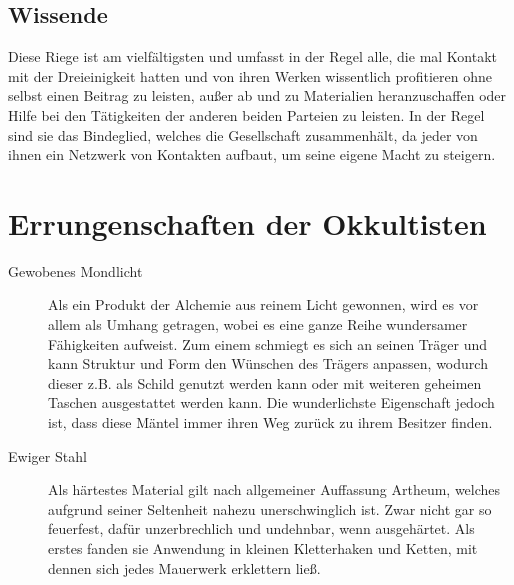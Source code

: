 \documentclass[a4paper,12pt,oneside]{book}
\begin{document}
\subsection{Wissende}
Diese Riege ist am vielfältigsten und umfasst in der Regel alle, die mal Kontakt mit der Dreieinigkeit hatten und von ihren Werken wissentlich profitieren ohne selbst einen Beitrag zu leisten, außer ab und zu Materialien heranzuschaffen oder Hilfe bei den Tätigkeiten der anderen beiden Parteien zu leisten. In der Regel sind sie das Bindeglied, welches die Gesellschaft zusammenhält, da jeder von ihnen ein Netzwerk von Kontakten aufbaut, um seine eigene Macht zu steigern.
\section{Errungenschaften der Okkultisten}
\begin{description}
\item[Gewobenes Mondlicht]Als ein Produkt der Alchemie aus reinem Licht gewonnen, wird es vor allem als Umhang getragen, wobei es eine ganze Reihe wundersamer Fähigkeiten aufweist. Zum einem schmiegt es sich an seinen Träger und kann Struktur und Form den Wünschen des Trägers anpassen, wodurch dieser z.B. als Schild genutzt werden kann oder mit weiteren geheimen Taschen ausgestattet werden kann. Die wunderlichste Eigenschaft jedoch ist, dass diese Mäntel immer ihren Weg zurück zu ihrem Besitzer finden.
\item[Ewiger Stahl]Als härtestes Material gilt nach allgemeiner Auffassung Artheum, welches aufgrund seiner Seltenheit nahezu unerschwinglich ist. Zwar nicht gar so feuerfest, dafür unzerbrechlich und undehnbar, wenn ausgehärtet. Als erstes fanden sie Anwendung in kleinen Kletterhaken und Ketten, mit dennen sich jedes Mauerwerk erklettern ließ.
\end{description}


\cleardoublepage
{}
{}
\printindex[Stichworte]
{}
\printindex[Geographie]
\end{document}
